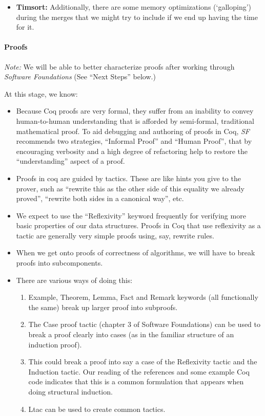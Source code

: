 \documentclass{article}
\begin{document}
\begin{itemize}
  \item \textbf{Timsort:}
	  Additionally, there are some memory optimizations (`galloping') during the merges that we might try to include if we end up having the time for it.
\end{itemize}

\paragraph{Proofs}  %
\emph{Note:} We will be able to better characterize proofs after
working through \emph{Software Foundations} \cite{sf}
(See ``Next Steps'' below.)

At this stage, we know:
\begin{itemize}
\item
  Because Coq proofs are very formal, they suffer from an inability to
  convey human-to-human understanding that is afforded by
  semi-formal, traditional mathematical proof.
  To aid debugging and authoring of proofs in Coq,
  \emph{SF} \cite{sf} recommends two strategies, ``Informal Proof''
  and ``Human Proof'', that by encouraging verbosity and a high degree
  of refactoring
  help to restore the ``understanding'' aspect of a proof.
\item Proofs in coq are guided by tactics. These are like hints you
  give to the prover, such as ``rewrite this as the other side of this
  equality we already proved'', ``rewrite both sides in a canonical
  way'',  etc.
\item We expect to use the ``Reflexivity'' keyword frequently for
  verifying more
  basic properties of our data structures.
  Proofs in Coq that use reflexivity as a tactic are generally very
  simple proofs using, say, rewrite rules.
\item When we get onto proofs of correctness of algorithms, we will
  have to break proofs into subcomponents.
\item There are various ways of doing this:
\begin{enumerate}
\item Example, Theorem, Lemma, Fact and Remark keywords (all
  functionally the same) break up larger proof into subproofs.
\item The Case proof tactic (chapter 3 of Software Foundations) can be
  used to break a proof clearly into cases (as in the familiar
  structure of an induction proof).
\item This could break a proof into say a case of the Reflexivity
  tactic and the Induction tactic.
  Our reading of the references and some example Coq code
  indicates that this is a common formulation that appears
  when doing structural induction.
\item Ltac can be used to create common tactics.
\end{enumerate}

\end{itemize}
\end{document}
